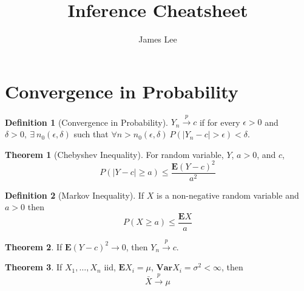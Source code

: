 \documentclass[11pt, twocolumn]{article}
\title{Inference Cheatsheet}
\author{James Lee}
\date{}
\newcommand{\E}{\mathbf{E}} 	%
\newcommand{\Var}{\mathbf{Var}}	%
\newcommand{\convp}{\xrightarrow{p}}    %
\theoremstyle{definition}
\newtheorem{thm}{Theorem}
\newtheorem{definition}{Definition}
\begin{document}
    \maketitle

    \section{Convergence in Probability}%
    \label{sec:convergence_in_probability}
    
    \begin{definition}[Convergence in Probability]
        $Y_n \convp c$ if for every $\epsilon>0$ and $\delta > 0,\ 
        \exists\ n_0(\epsilon, \delta)$ such that 
        $\forall n > n_0(\epsilon, \delta)\ 
        P(|Y_n - c| > \epsilon) < \delta$.
    \end{definition}

    \begin{thm}[Chebyshev Inequality]
    For random variable, $Y$, $a>0$, and $c$,
        \begin{equation}
            P(|Y-c| \ge a) \le \frac{\E (Y-c)^2}{a^2}
        \end{equation}    
    \end{thm}

    \begin{definition}[Markov Inequality]
        If $X$ is a non-negative random variable and $a>0$ then
        \begin{equation}
            P( X \ge a) \le \frac{\E X}{a}
        \end{equation}
    \end{definition}

    \begin{thm}
        If $\E (Y-c)^2 \to 0$, then $Y_n \convp c$.
    \end{thm}

    \begin{thm}
        If $X_1, \ldots, X_n$ iid, $\E X_i = \mu$, $\Var X_i = \sigma^2 < \infty$, then
        \begin{equation}
            \bar{X} \convp \mu
        \end{equation}
    \end{thm}
    
\end{document}
